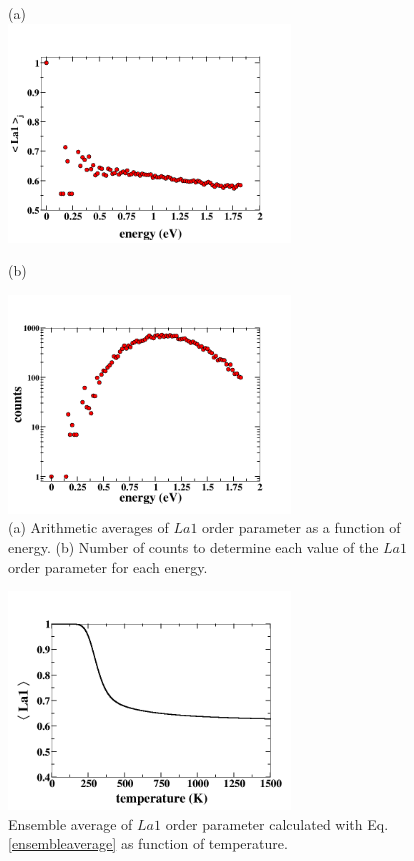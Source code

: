 \documentclass[aps,pre,reprint,superscriptaddress,showkeys]{revtex4-1}
\begin{document}
\begin{figure}[h!]
(a)\\
\includegraphics[width=7.5cm]{./figures/avg_OP.png}\\
\centerline{(b)}
\includegraphics[width=7.5cm]{./figures/OPcounts.png}
\caption{(a) Arithmetic averages of $La1$ order parameter as a function of energy. (b) Number of counts to determine each value of the $La1$ order parameter for each energy. \label{arithemetic_avg}}
\end{figure}

\begin{figure}[h!]
\includegraphics[width=7.5cm]{./figures/OP_ensemble_avg.png}
\caption{Ensemble average of $La1$ order parameter calculated with Eq. \ref{ensembleaverage} as function of temperature. \label{ensembleOP}}
\end{figure}
\end{document}
